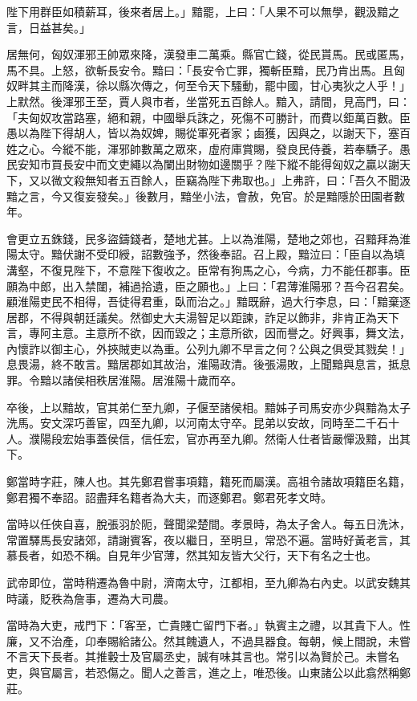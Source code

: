 \begin{pinyinscope}
陛下用群臣如積薪耳，後來者居上。」黯罷，上曰：「人果不可以無學，觀汲黯之言，日益甚矣。」

居無何，匈奴渾邪王帥眾來降，漢發車二萬乘。縣官亡錢，從民貰馬。民或匿馬，馬不具。上怒，欲斬長安令。黯曰：「長安令亡罪，獨斬臣黯，民乃肯出馬。且匈奴畔其主而降漢，徐以縣次傳之，何至令天下騷動，罷中國，甘心夷狄之人乎！」上默然。後渾邪王至，賈人與市者，坐當死五百餘人。黯入，請間，見高門，曰：「夫匈奴攻當路塞，絕和親，中國舉兵誅之，死傷不可勝計，而費以鉅萬百數。臣愚以為陛下得胡人，皆以為奴婢，賜從軍死者家；鹵獲，因與之，以謝天下，塞百姓之心。今縱不能，渾邪帥數萬之眾來，虛府庫賞賜，發良民侍養，若奉驕子。愚民安知市買長安中而文吏繩以為闌出財物如邊關乎？陛下縱不能得匈奴之贏以謝天下，又以微文殺無知者五百餘人，臣竊為陛下弗取也。」上弗許，曰：「吾久不聞汲黯之言，今又復妄發矣。」後數月，黯坐小法，會赦，免官。於是黯隱於田園者數年。

會更立五銖錢，民多盜鑄錢者，楚地尤甚。上以為淮陽，楚地之郊也，召黯拜為淮陽太守。黯伏謝不受印綬，詔數強予，然後奉詔。召上殿，黯泣曰：「臣自以為填溝壑，不復見陛下，不意陛下復收之。臣常有狗馬之心，今病，力不能任郡事。臣願為中郎，出入禁闥，補過拾遺，臣之願也。」上曰：「君薄淮陽邪？吾今召君矣。顧淮陽吏民不相得，吾徒得君重，臥而治之。」黯既辭，過大行李息，曰：「黯棄逐居郡，不得與朝廷議矣。然御史大夫湯智足以距諫，詐足以飾非，非肯正為天下言，專阿主意。主意所不欲，因而毀之；主意所欲，因而譽之。好興事，舞文法，內懷詐以御主心，外挾賊吏以為重。公列九卿不早言之何？公與之俱受其戮矣！」息畏湯，終不敢言。黯居郡如其故治，淮陽政清。後張湯敗，上聞黯與息言，抵息罪。令黯以諸侯相秩居淮陽。居淮陽十歲而卒。

卒後，上以黯故，官其弟仁至九卿，子偃至諸侯相。黯姊子司馬安亦少與黯為太子洗馬。安文深巧善宦，四至九卿，以河南太守卒。昆弟以安故，同時至二千石十人。濮陽段宏始事蓋侯信，信任宏，官亦再至九卿。然衛人仕者皆嚴憚汲黯，出其下。

鄭當時字莊，陳人也。其先鄭君嘗事項籍，籍死而屬漢。高祖令諸故項籍臣名籍，鄭君獨不奉詔。詔盡拜名籍者為大夫，而逐鄭君。鄭君死孝文時。

當時以任俠自喜，脫張羽於阨，聲聞梁楚間。孝景時，為太子舍人。每五日洗沐，常置驛馬長安諸郊，請謝賓客，夜以繼日，至明旦，常恐不遍。當時好黃老言，其慕長者，如恐不稱。自見年少官薄，然其知友皆大父行，天下有名之士也。

武帝即位，當時稍遷為魯中尉，濟南太守，江都相，至九卿為右內史。以武安魏其時議，貶秩為詹事，遷為大司農。

當時為大吏，戒門下：「客至，亡貴賤亡留門下者。」執賓主之禮，以其貴下人。性廉，又不治產，卬奉賜給諸公。然其餽遺人，不過具器食。每朝，候上間說，未嘗不言天下長者。其推轂士及官屬丞史，誠有味其言也。常引以為賢於己。未嘗名吏，與官屬言，若恐傷之。聞人之善言，進之上，唯恐後。山東諸公以此翕然稱鄭莊。


\end{pinyinscope}
